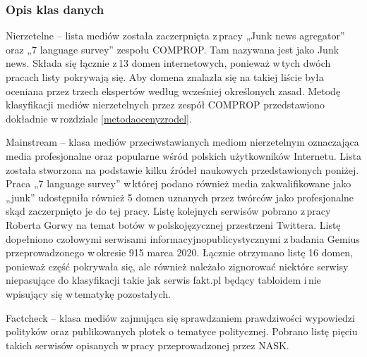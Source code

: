 \subsubsection{Opis klas danych}
\par
Nierzetelne – lista mediów została zaczerpnięta z\,pracy „Junk news agregator” \cite{liotsiou2019junk} oraz „7 language survey” \cite{marchal2019junk} zespołu COMPROP. Tam nazywana jest jako Junk news. Składa się łącznie z\,13 domen internetowych, ponieważ w\,tych dwóch pracach listy pokrywają się. Aby domena znalazła się na takiej liście była oceniana przez trzech ekspertów według wcześniej określonych zasad. Metodę klasyfikacji mediów nierzetelnych przez zespół COMPROP przedstawiono dokładnie w\,rozdziale \ref{metodaocenyzrodel}.
\par
Mainstream – klasa mediów przeciwstawianych mediom nierzetelnym oznaczająca media profesjonalne oraz popularne wśród polskich użytkowników Internetu. Lista została stworzona na podstawie kilku źródeł naukowych przedstawionych poniżej. Praca „7 language survey” w\,której podano również media zakwalifikowane jako „junk” udostępniła również 5 domen uznanych przez twórców jako profesjonalne skąd zaczerpnięto je do tej pracy. Listę kolejnych serwisów pobrano z\,pracy Roberta Gorwy na temat botów w\,polskojęzycznej przestrzeni Twittera\cite{gorwa2017computational}. Listę dopełniono czołowymi serwisami informacyjnopublicystycznymi z\,badania Gemius przeprowadzonego w\,okresie 915 marca 2020\cite{GemiusSerwisy2020}. Łącznie otrzymano listę 16 domen, ponieważ część pokrywała się, ale również należało zignorować niektóre serwisy niepasujące do klasyfikacji takie jak serwis fakt.pl będący tabloidem i\,nie wpisujący się w\,tematykę pozostałych.
\par
Factcheck – klasa mediów zajmująca się sprawdzaniem prawdziwości wypowiedzi polityków oraz publikowanych plotek o tematyce politycznej. Pobrano listę pięciu takich serwisów opisanych w\,pracy przeprowadzonej przez NASK\cite{NASKZjawiskoDezinformacji2019}. 
